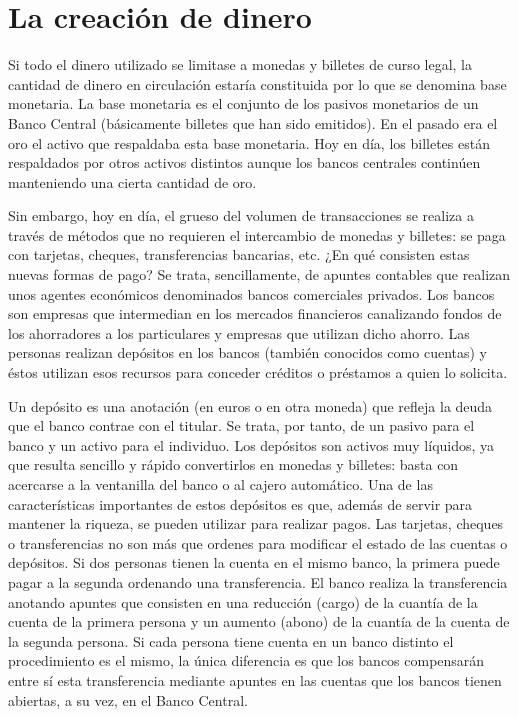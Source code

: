 \documentclass[
]{krantz}
\begin{document}
\hypertarget{la-creaciuxf3n-de-dinero}{%
\section{La creación de dinero}\label{la-creaciuxf3n-de-dinero}}

Si todo el dinero utilizado se limitase a monedas y billetes de curso legal, la cantidad de dinero en circulación estaría constituida por lo que se denomina base monetaria. La base monetaria es el conjunto de los pasivos monetarios de un Banco Central (básicamente billetes que han sido emitidos). En el pasado era el oro el activo que respaldaba esta base monetaria. Hoy en día, los billetes están respaldados por otros activos distintos aunque los bancos centrales continúen manteniendo una cierta cantidad de oro.

Sin embargo, hoy en día, el grueso del volumen de transacciones se realiza a través de métodos que no requieren el intercambio de monedas y billetes: se paga con tarjetas, cheques, transferencias bancarias, etc. ¿En qué consisten estas nuevas formas de pago? Se trata, sencillamente, de apuntes contables que realizan unos agentes económicos denominados bancos comerciales privados. Los bancos son empresas que intermedian en los mercados financieros
canalizando fondos de los ahorradores a los particulares y empresas que utilizan dicho ahorro. Las personas realizan depósitos en los bancos (también conocidos como cuentas) y éstos utilizan esos recursos para conceder créditos o préstamos a quien lo solicita.

Un depósito es una anotación (en euros o en otra moneda) que refleja la deuda que el banco contrae con el titular. Se trata, por tanto, de un pasivo para el banco y un activo para el individuo. Los depósitos son activos muy líquidos, ya que resulta sencillo y rápido convertirlos en monedas y billetes: basta con acercarse a la ventanilla del banco o al cajero automático. Una de las características importantes de estos depósitos es que, además de servir para mantener la riqueza, se pueden utilizar para realizar pagos. Las tarjetas, cheques o transferencias no son más que ordenes para modificar el estado de las cuentas o depósitos. Si dos personas tienen la cuenta en el mismo banco, la primera puede pagar a la segunda ordenando una transferencia. El banco realiza la transferencia anotando apuntes que consisten en una reducción (cargo) de la cuantía de la cuenta de la primera persona y un aumento (abono) de la cuantía de la cuenta de la segunda persona. Si cada persona tiene cuenta en un banco distinto el procedimiento es el mismo, la única diferencia es que los bancos compensarán entre sí esta transferencia mediante apuntes en las cuentas que los bancos tienen abiertas, a su vez, en el Banco Central.
\end{document}
